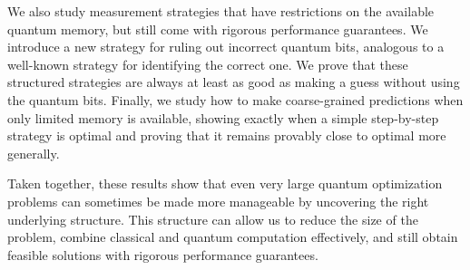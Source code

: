 
We also study measurement strategies that have restrictions on the available quantum memory, but still come with rigorous performance guarantees.
We introduce a new strategy for ruling out incorrect quantum bits, analogous to a well-known strategy for identifying the correct one.
We prove that these structured strategies are always at least as good as making a guess without using the quantum bits. 
Finally, we study how to make coarse-grained predictions when only limited memory is available, showing exactly when a simple step-by-step strategy is optimal and proving that it remains provably close to optimal more generally.


Taken together, these results show that even very large quantum optimization problems can sometimes be made more manageable by uncovering the right underlying structure. 
This structure can allow us to reduce the size of the problem, combine classical and quantum computation effectively, and still obtain feasible solutions with rigorous performance guarantees.